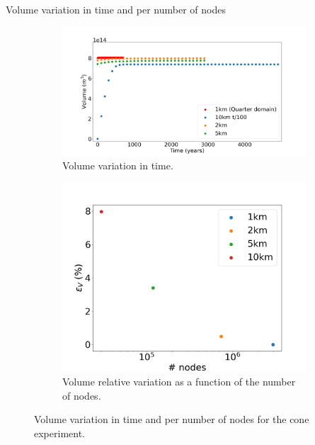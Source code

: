 \documentclass[11pt]{beamer}
\begin{document}
		\begin{frame}{Volume variation in time and per number of nodes}
		\begin{figure}
			\centering
			\begin{subfigure}{.5\textwidth}
				\centering
				\includegraphics[width=1.1\linewidth]{../fig/Volume_CONE_full_all_res_vs_time_2.png}
				\caption{Volume variation in time.}
				\label{VOLUME_CONE_VS_TIME}
			\end{subfigure}%
			\begin{subfigure}{.5\textwidth}
				\centering
				\includegraphics[width=1.1\linewidth]{../fig/Volume_CONE_full_all_res_vs_num_nodes.png}
				\caption{Volume relative variation as a function of the number of nodes.}
				\label{H_CONE_VS_NODES}
			\end{subfigure}%
			\caption{Volume variation in time and per number of nodes for the cone experiment.}
			\label{Volume_CONE_VS_TIME_VS_NODES}
		\end{figure}
		\end{frame}
\end{document}
